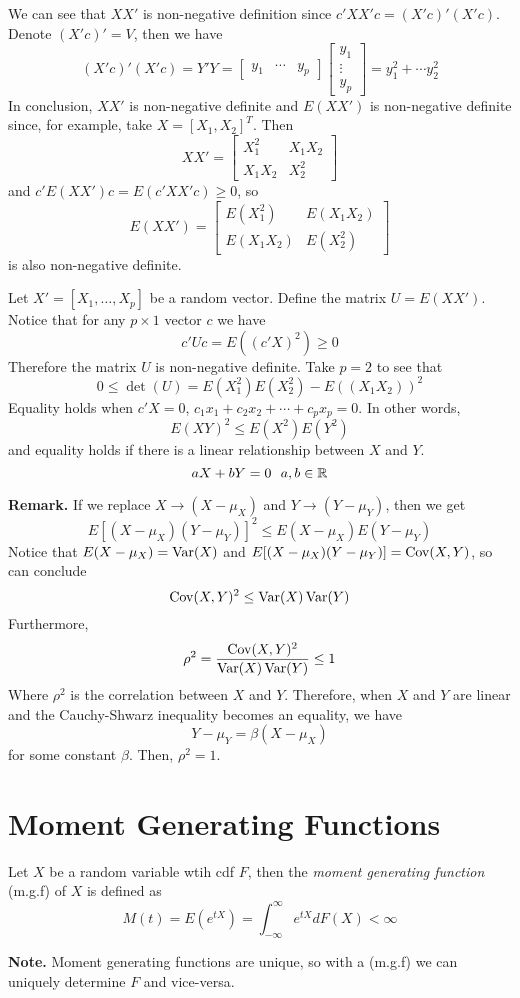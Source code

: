 \documentclass[openany]{report}
\begin{document}
We can see that $XX'$ is non-negative definition since $c'XX'c = (X'c)'(X'c)$. Denote $(X'c)' = V$, then we have 
\[(X'c)'(X'c) = Y'Y = \begin{bmatrix}
    y_1 & \cdots & y_p
\end{bmatrix}\begin{bmatrix}
    y_1 \\ \vdots \\ y_p
\end{bmatrix} = y_1^2 + \cdots y_2^2\]
In conclusion, $XX'$ is non-negative definite and $E(XX')$ is non-negative definite since, for example, take $X = [X_1, X_2]^T$. Then 
\[XX' = \begin{bmatrix}
    X_1^2 & X_1X_2\\
    X_1X_2 & X_2^2
\end{bmatrix}\]
and $c'E(XX')c = E(c'XX'c) \geq 0$, so  
\[E(XX') = \begin{bmatrix}
    E(X_1^2) & E(X_1X_2)\\
    E(X_1X_2) & E(X_2^2)
\end{bmatrix}\]
is also non-negative definite.

\begin{theorem}
    Let $X' = [X_1, \ldots, X_p]$ be a random vector. Define the matrix $U = E(XX')$. Notice that for any $p \times 1$ vector $c$ we have 
    \[c'Uc = E((c'X)^2) \geq 0\]
    Therefore the matrix $U$ is non-negative definite. Take $p = 2$ to see that 
    \[0 \leq \det(U) = E(X_1^2)E(X_2^2) - E((X_1X_2))^2\]
    Equality holds when $c'X = 0$, $c_1x_1 + c_2x_2 + \cdots + c_px_p = 0$. In other words, 
    \[E(XY)^2 \leq E(X^2)E(Y^2)\]
    and equality holds if there is a linear relationship between $X$ and $Y$.
    \[aX + bY = 0 \ \ a,b \in \mathbb{R}\]
\end{theorem}
\noindent
\textbf{Remark.} If we replace $X \rightarrow (X-\mu_X)$ and $Y \rightarrow (Y-\mu_Y)$, then we get
\[E[(X-\mu_X)(Y-\mu_Y)]^2 \leq E(X-\mu_X)E(Y-\mu_Y)\]
Notice that $E(X-\mu_X) = \operatorname{Var}(X)$ and $E[(X-\mu_X)(Y-\mu_Y)] = \operatorname{Cov}(X,Y)$, so can conclude 
\[\operatorname{Cov}(X,Y)^2 \leq \operatorname{Var}(X)\operatorname{Var}(Y)\]
Furthermore, 
\[\rho^2 = \frac{\operatorname{Cov}(X,Y)^2}{\operatorname{Var}(X)\operatorname{Var}(Y)} \leq 1\]
Where $\rho^2$ is the correlation between $X$ and $Y$. Therefore, when $X$ and $Y$ are linear and the Cauchy-Shwarz inequality becomes an equality, we have 
\[Y - \mu_Y = \beta(X - \mu_X)\]
for some constant $\beta$. Then, $\rho^2 = 1$.  
\section{Moment Generating Functions}
\begin{definition}
    Let $X$ be a random variable wtih cdf $F$, then the \emph{moment generating function} (m.g.f) of $X$ is defined as
    \[M(t) = E(e^{tX}) = \int_{-\infty}^\infty e^{tX}dF(X) < \infty\]
\end{definition}
\noindent
\textbf{Note.} Moment generating functions are unique, so with a (m.g.f) we can uniquely determine $F$ and vice-versa. 
\end{document}
